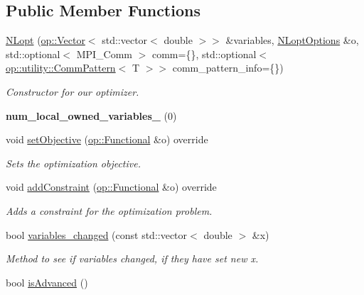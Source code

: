 \subsection*{Public Member Functions}
\begin{DoxyCompactItemize}
\item 
\hypertarget{classop_1_1NLopt_a1ed2908f747c6506ac7d28fb92d01ede}{\hyperlink{classop_1_1NLopt_a1ed2908f747c6506ac7d28fb92d01ede}{N\-Lopt} (\hyperlink{classop_1_1Vector}{op\-::\-Vector}$<$ std\-::vector$<$ double $>$$>$ \&variables, \hyperlink{structop_1_1NLoptOptions}{N\-Lopt\-Options} \&o, std\-::optional$<$ M\-P\-I\-\_\-\-Comm $>$ comm=\{\}, std\-::optional$<$ \hyperlink{structop_1_1utility_1_1CommPattern}{op\-::utility\-::\-Comm\-Pattern}$<$ T $>$$>$ comm\-\_\-pattern\-\_\-info=\{\})}\label{classop_1_1NLopt_a1ed2908f747c6506ac7d28fb92d01ede}

\begin{DoxyCompactList}\small\item\em Constructor for our optimizer. \end{DoxyCompactList}\item 
\hypertarget{classop_1_1NLopt_a2ee351c67324faded262583c27dabe00}{{\bfseries num\-\_\-local\-\_\-owned\-\_\-variables\-\_\-} (0)}\label{classop_1_1NLopt_a2ee351c67324faded262583c27dabe00}

\item 
void \hyperlink{classop_1_1NLopt_afe2f2eca4b0fd4b8d2aa0e819f8bd83f}{set\-Objective} (\hyperlink{classop_1_1Functional}{op\-::\-Functional} \&o) override
\begin{DoxyCompactList}\small\item\em Sets the optimization objective. \end{DoxyCompactList}\item 
void \hyperlink{classop_1_1NLopt_aad04273dde9c66444ed727928fcc6197}{add\-Constraint} (\hyperlink{classop_1_1Functional}{op\-::\-Functional} \&o) override
\begin{DoxyCompactList}\small\item\em Adds a constraint for the optimization problem. \end{DoxyCompactList}\item 
bool \hyperlink{classop_1_1NLopt_ad92c30719e3cc720ebefccedd591e543}{variables\-\_\-changed} (const std\-::vector$<$ double $>$ \&x)
\begin{DoxyCompactList}\small\item\em Method to see if variables changed, if they have set new x. \end{DoxyCompactList}\item 
\hypertarget{classop_1_1NLopt_a5c54d30b88b4de8b19774cd3fb12f482}{bool \hyperlink{classop_1_1NLopt_a5c54d30b88b4de8b19774cd3fb12f482}{is\-Advanced} ()}\label{classop_1_1NLopt_a5c54d30b88b4de8b19774cd3fb12f482}


\end{DoxyCompactItemize}
